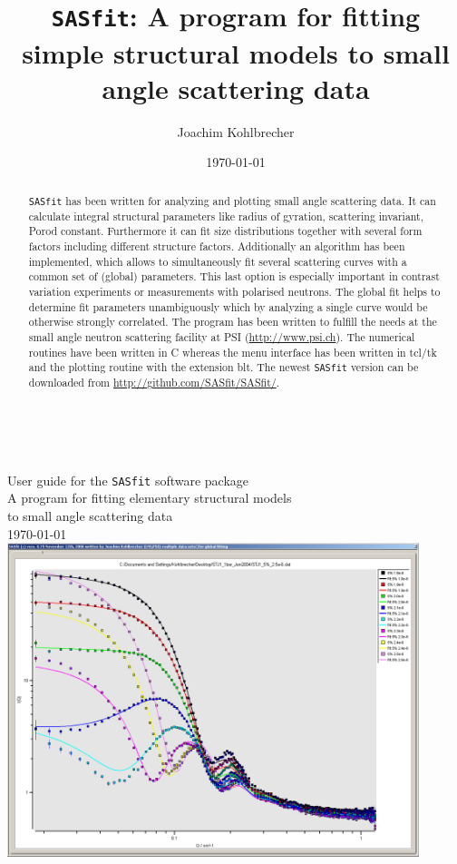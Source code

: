 \documentclass[12pt,intlimits,fleqn,reqno,twoside,english,a4wide]{amsbook}
\author[J. Kohlbrecher]{Joachim Kohlbrecher}
\numberwithin{equation}{chapter}
\numberwithin{figure}{chapter}
\numberwithin{section}{chapter}
\begin{document}
\sloppy

\setcounter{page}{0}
\thispagestyle{empty}
~\\
\begin{center}
{\Large User guide for the {\tt SASfit} software package} \\[1cm]

A program for fitting elementary structural models\\
to small angle scattering data
\\[0.5cm]
\today
~\\[1.5cm]
\includegraphics[width=0.9\textwidth]{SASfit.png}
\end{center}


\title[SASfit]{{\tt SASfit}: A program for fitting simple
 structural models to small angle scattering data}

\date{\today}

\begin{abstract}
{\tt SASfit} has been written for analyzing and plotting small angle
scattering data. It can calculate integral structural parameters
like radius of gyration, scattering invariant, Porod constant.
Furthermore it can fit size distributions together with several form
factors including different structure factors. Additionally an
algorithm has been implemented, which allows to simultaneously fit
several scattering curves with a common set of (global) parameters.
This last option is especially important in contrast variation
experiments or measurements with polarised neutrons. The global fit
helps to determine fit parameters unambiguously which by analyzing a
single curve would be otherwise strongly correlated. The program has
been written to fulfill the needs at the small angle neutron
scattering facility at PSI (\url{http://www.psi.ch}). The
numerical routines have been written in C whereas the menu interface
has been written in tcl/tk and the plotting routine with the
extension blt. The newest {\tt SASfit} version can be downloaded
from \url{http://github.com/SASfit/SASfit/}.
\end{abstract}
\maketitle
\end{document}
